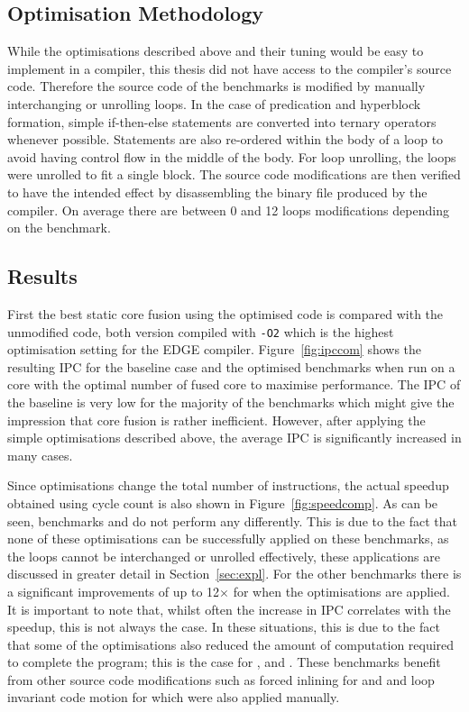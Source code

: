 \subsection{Optimisation Methodology}
While the optimisations described above and their tuning would be easy to implement in a compiler, this thesis did not have access to the compiler's source code.
Therefore the source code of the benchmarks is modified by manually interchanging or unrolling loops.
In the case of predication and hyperblock formation, simple if-then-else statements are converted into ternary operators whenever possible.
Statements are also re-ordered within the body of a loop to avoid having control flow in the middle of the body.
For loop unrolling, the loops were unrolled to fit a single block.
The source code modifications are then verified to have the intended effect by disassembling the binary file produced by the compiler.
On average there are between 0 and 12 loops modifications depending on the benchmark.

\subsection{Results}
First the best static core fusion using the optimised code is compared with the unmodified code, both version compiled with \texttt{-O2} which is the highest optimisation setting for the EDGE compiler.
Figure~\ref{fig:ipccom} shows the resulting IPC for the baseline case and the optimised benchmarks when run on a core with the optimal number of fused core to maximise performance.
The IPC of the baseline is very low for the majority of the benchmarks which might give the impression that core fusion is rather inefficient.
However, after applying the simple optimisations described above, the average IPC is significantly increased in many cases.

Since optimisations change the total number of instructions, the actual speedup obtained using cycle count is also shown in Figure~\ref{fig:speedcomp}.
As can be seen, benchmarks  and  do not perform any differently.
This is due to the fact that none of these optimisations can be successfully applied on these benchmarks, as the loops cannot be interchanged or unrolled effectively, these applications are discussed in greater detail in Section~\ref{sec:expl}.
For the other benchmarks there is a significant improvements of up to 12$\times$ for  when the optimisations are applied.
It is important to note that, whilst often the increase in IPC correlates with the speedup, this is not always the case.
In these situations, this is due to the fact that some of the optimisations also reduced the amount of computation required to complete the program; this is the case for ,  and .
These benchmarks benefit from other source code modifications such as forced inlining for  and  and loop invariant code motion for  which were also applied manually.

